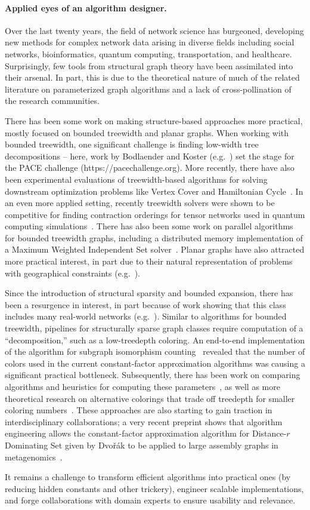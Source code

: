 \paragraph*{Applied eyes of an algorithm designer.}

Over the last twenty years, the field of network science
has burgeoned, developing new methods for complex network data arising
in diverse fields including social networks, bioinformatics, quantum computing,
transportation, and healthcare. Surprisingly, few tools from structural graph theory have been assimilated into
their arsenal. In part, this is due to the theoretical nature of
much of the related literature on parameterized graph algorithms
and a lack of cross-pollination of the research
communities.

There has been some work on making structure-based approaches more practical, mostly focused on
bounded treewidth and planar graphs. When working with bounded treewidth, one significant
challenge is finding low-width tree decompositions -- here, work by Bodlaender and Koster (e.g.~\cite{bodlaender2006-tw, koster2001-tw})
set the stage for the PACE challenge (https://pacechallenge.org). More recently, there have also been
experimental evaluations of treewidth-based algorithms for solving downstream optimization problems like
Vertex Cover and Hamiltonian Cycle~\cite{ziobro2018hamcycle-tw, alber2005vc-tw}. In an even more
applied setting, recently treewidth solvers were shown to be competitive for finding contraction orderings
for tensor networks used in quantum computing simulations~\cite{dumitrescu2018tensors}. There has also been some
work on parallel algorithms for bounded treewidth graphs, including a distributed memory implementation of a
Maximum Weighted Independent Set solver~\cite{sullivan2013paralleltd}.
Planar graphs have also attracted more practical interest, in part due to their natural representation of problems with geographical
constraints (e.g.~\cite{alber2001-planar,schmidt2009-planarvision}).

Since the introduction of structural sparsity and bounded expansion,
there has been a resurgence in interest, in part because of work showing that
this class includes many real-world networks (e.g.~\cite{DemaineRRVSS14}).
Similar to algorithms for bounded treewidth, pipelines for structurally sparse graph classes
require computation of a ``decomposition,'' such as a low-treedepth coloring. An end-to-end implementation
of the algorithm for subgraph isomorphism counting~\cite{obrien2017concuss} revealed that the
number of colors used in the current constant-factor approximation algorithms was causing a significant
practical bottleneck. Subsequently, there has been work on comparing algorithms and heuristics
for computing these parameters~\cite{wojciech2018quasiwide}, as well as more theoretical research
on alternative colorings that trade off treedepth for smaller coloring numbers~\cite{kun2018lincolor}.
These approaches are also starting to gain traction in interdisciplinary collaborations; a very recent
preprint shows that algorithm engineering allows the constant-factor approximation algorithm
for Distance-$r$ Dominating Set given by Dvo\v{r}\'ak to be applied to large assembly graphs in metagenomics~\cite{brown2018metagenome}.

It remains a challenge to transform efficient algorithms into practical ones (by reducing hidden constants and other trickery),
engineer scalable implementations, and forge collaborations with domain experts to ensure usability and relevance.
